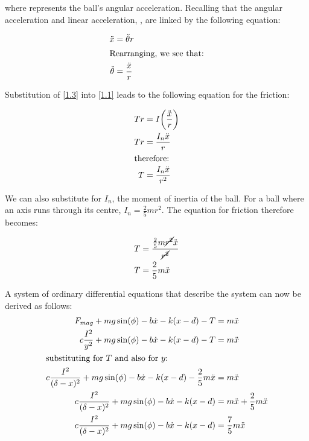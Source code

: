 \documentclass[a4paper,10pt,reqno]{amsart}
\numberwithin{equation}{section}
\begin{document}
\newline where \ddot{\theta} represents the ball's angular acceleration. Recalling that the angular acceleration and linear acceleration, , are linked by the following equation:

\begin{align}
\ddot{x} &= \ddot{\theta}r \label{1.2} \\
\intertext{Rearranging, we see that:}
\ddot{\theta} &= \frac{\ddot{x}}{r} \label{1.3}
\end{align}

\newline Substitution of \ref{1.3} into \ref{1.1} leads to the following equation for the friction:

\begin{align}
Tr &= I\bigg(\frac{\ddot{x}}{r}\bigg)\nonumber\\
Tr &= \frac{I_n\ddot{x}}{r} \nonumber \\
\intertext{therefore:}
T &= \frac{I_n\ddot{x}}{r^2} \label{1.4}
\end{align}

\newline We can also substitute for $I_n$, the moment of inertia of the ball.
\newline For a ball where an axis runs through its centre, $I_n = \frac{2}{5}mr^2$.
\newline The equation for friction therefore becomes:

\begin{align}
T &= \frac{\frac{2}{5}m\cancel{r^2}\ddot{x}}{\cancel{r^2}} \nonumber \\
T &= \frac{2}{5}m\ddot{x} \label{1.5}
\end{align}
\vspace{3mm}

\newline A system of ordinary differential equations that describe the system can now be derived as follows:
\begin{align}
F_{mag} + mg\sin(\phi) - b\dot{x} - k(x - d) - T &= m\ddot{x} \nonumber \\
c \frac{I^2}{y^2} + mg\sin(\phi) - b\dot{x} - k(x - d) - T &= m\ddot{x} \nonumber \\
\intertext{substituting for $T$ and also for $y$:}
c \frac{I^2}{(\delta - x)^2} + mg\sin(\phi) - b\dot{x} - k(x - d) - \frac{2}{5}m\ddot{x} &= m\ddot{x} \nonumber \\
c \frac{I^2}{(\delta - x)^2} + mg\sin(\phi) - b\dot{x} - k(x - d) &= m\ddot{x} + \frac{2}{5}m\ddot{x}\nonumber \\
c \frac{I^2}{(\delta - x)^2} + mg\sin(\phi) - b\dot{x} - k(x - d) &= \frac{7}{5}m\ddot{x}\nonumber
\end{align}
\end{document}
